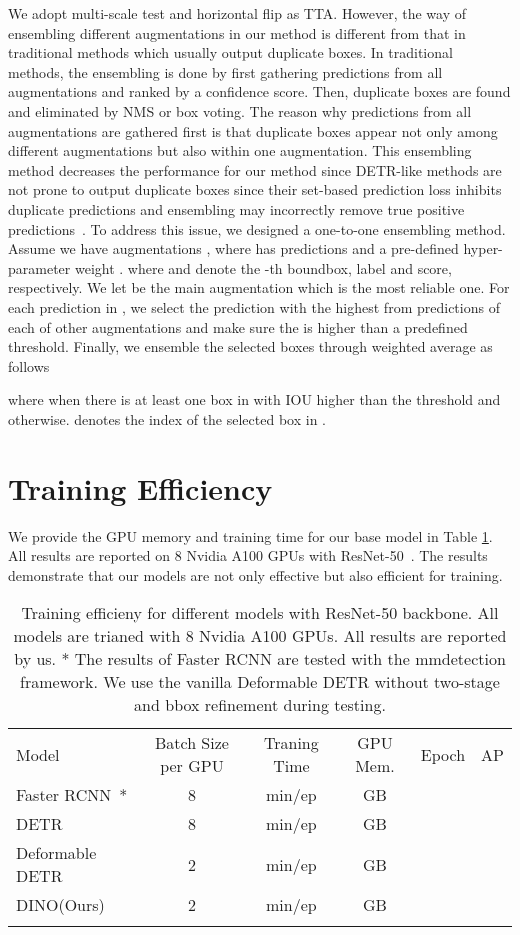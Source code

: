 \documentclass[runningheads]{llncs}
\begin{document}
We adopt multi-scale test and horizontal flip as TTA. However, the way of ensembling different augmentations in our method is different from that in traditional methods which usually output duplicate boxes. In traditional methods, the ensembling is done by first gathering predictions from all augmentations and ranked by a confidence score. Then, duplicate boxes are found and eliminated by NMS or box voting. The reason why predictions from all augmentations are gathered first is that duplicate boxes appear not only among different augmentations but also within one augmentation. This ensembling method decreases the performance for our method since DETR-like methods are not prone to output duplicate boxes since their set-based prediction loss inhibits duplicate predictions and 
ensembling may incorrectly remove true
positive predictions~\cite{carion2020end}. To address this issue, we designed a one-to-one ensembling method. Assume we have  augmentations , where  has predictions  and a pre-defined hyper-parameter weight .  where  and  denote the -th boundbox, label and score, respectively. We let  be the main augmentation which is the most reliable one. For each prediction in , we select the prediction with the highest  from predictions of each of other augmentations  and make sure the  is higher than a predefined threshold. Finally, we ensemble the selected boxes through weighted average as follows

where  when there is at least one box in  with IOU higher than the threshold and  otherwise.  denotes the index of the selected box in .

\section{Training Efficiency}
We provide the GPU memory and training time for our base model in Table \ref{tab:gpu_memory}. All results are reported on 8 Nvidia A100 GPUs with ResNet-50~\cite{he2015deep}. The results demonstrate that our models are not only effective but also efficient for training. 
\begin{table}[h]
    \centering
    \begin{tabular}{l|c|c|c|c|c}
	\shline
	Model & Batch Size per GPU & Traning Time & GPU Mem. & Epoch & AP \\
	\shline
	Faster RCNN~\cite{ren2015faster}* & 8 & min/ep & GB &  &  \\
	DETR~\cite{carion2020end} & 8 & min/ep & GB &   &  \\
	Deformable DETR~\cite{zhu2020deformable} & 2 & min/ep & GB &   &  \\
	DINO(Ours) & 2 &  min/ep & GB &   &  \\
	\shline
    \end{tabular}
    \vspace{0.3cm}
    \caption{Training efficieny for different models with ResNet-50 backbone. All models are trianed with 8 Nvidia A100 GPUs. All results are reported by us. * The results of Faster RCNN are tested with the mmdetection framework.  We use the vanilla Deformable DETR without two-stage and bbox refinement during testing.
}
    \label{tab:gpu_memory}
\end{table}
\end{document}
